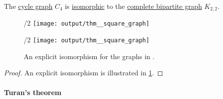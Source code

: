 \begin{proposition}\label{thm:square_graph}
  The \hyperref[def:cycle_graph]{cycle graph} \( C_4 \) is \hyperref[def:undirected_graph/homomorphism]{isomorphic} to the \hyperref[def:complete_multipartite_graph]{complete bipartite graph} \( K_{2,2} \).

  \begin{figure}[!ht]
    \begin{subcaptionblock}{\textwidth/2}
      \centering
      \texttt{[image: output/thm\_\_square\_graph]}
      \caption{\( C_4 \)}\label{fig:thm:square_graph/c4}
    \end{subcaptionblock}
    \hfill
    \begin{subcaptionblock}{\textwidth/2}
      \centering
      \texttt{[image: output/thm\_\_square\_graph]}
      \caption{\( K_{2,2} \)}\label{fig:thm:square_graph/k22}
    \end{subcaptionblock}
    \caption{An explicit isomorphism for the graphs in .}\label{fig:thm:square_graph}
  \end{figure}
\end{proposition}
\begin{proof}
  An explicit isomorphism is illustrated in \cref{fig:thm:square_graph}.
\end{proof}

\paragraph{Turan's theorem}

